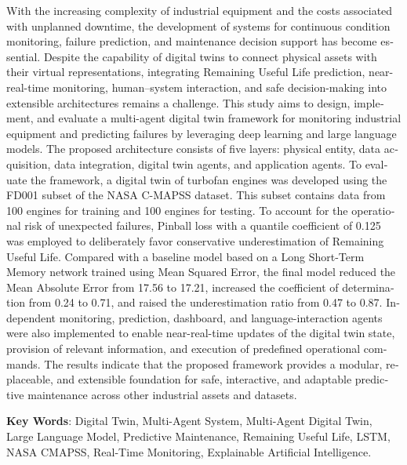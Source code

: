 \begin{latin}
\begin{small}
With the increasing complexity of industrial equipment and the costs associated with unplanned downtime, the development of systems for continuous condition monitoring, failure prediction, and maintenance decision support has become essential. Despite the capability of digital twins to connect physical assets with their virtual representations, integrating Remaining Useful Life prediction, near-real-time monitoring, human--system interaction, and safe decision-making into extensible architectures remains a challenge. This study aims to design, implement, and evaluate a multi-agent digital twin framework for monitoring industrial equipment and predicting failures by leveraging deep learning and large language models. The proposed architecture consists of five layers: physical entity, data acquisition, data integration, digital twin agents, and application agents. To evaluate the framework, a digital twin of turbofan engines was developed using the FD001 subset of the NASA C-MAPSS dataset. This subset contains data from 100 engines for training and 100 engines for testing. To account for the operational risk of unexpected failures, Pinball loss with a quantile coefficient of 0.125 was employed to deliberately favor conservative underestimation of Remaining Useful Life. Compared with a baseline model based on a Long Short-Term Memory network trained using Mean Squared Error, the final model reduced the Mean Absolute Error from 17.56 to 17.21, increased the coefficient of determination from 0.24 to 0.71, and raised the underestimation ratio from 0.47 to 0.87. Independent monitoring, prediction, dashboard, and language-interaction agents were also implemented to enable near-real-time updates of the digital twin state, provision of relevant information, and execution of predefined operational commands. The results indicate that the proposed framework provides a modular, replaceable, and extensible foundation for safe, interactive, and adaptable predictive maintenance across other industrial assets and datasets.


\end{small}

\vspace{0.5 cm}

\noindent \textbf{Key Words}: Digital Twin, Multi-Agent System, Multi-Agent Digital Twin, Large Language Model, Predictive Maintenance, Remaining Useful Life, LSTM, NASA CMAPSS, Real-Time Monitoring, Explainable Artificial Intelligence.

\end{latin}